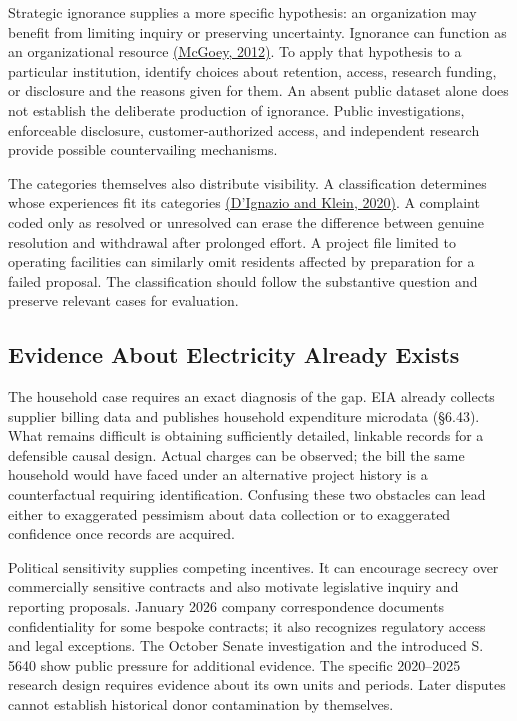 Strategic ignorance supplies a more specific hypothesis: an organization
may benefit from limiting inquiry or preserving uncertainty. Ignorance
can function as an organizational resource
\href{https://repository.essex.ac.uk/5131/}{(McGoey, 2012)}. To apply
that hypothesis to a particular institution, identify choices about
retention, access, research funding, or disclosure and the reasons given
for them. An absent public dataset alone does not establish the
deliberate production of ignorance. Public investigations, enforceable
disclosure, customer-authorized access, and independent research provide
possible countervailing mechanisms.

The categories themselves also distribute visibility. A classification
determines whose experiences fit its categories
\href{https://data-feminism.mitpress.mit.edu/pub/h1w0nbqp/release/3}{(D'Ignazio
and Klein, 2020)}. A complaint coded only as resolved or unresolved can
erase the difference between genuine resolution and withdrawal after
prolonged effort. A project file limited to operating facilities can
similarly omit residents affected by preparation for a failed proposal.
The classification should follow the substantive question and preserve
relevant cases for evaluation.

\hypertarget{M09-evidence-about-electricity-already-exists}{%
\subsection{Evidence About Electricity Already
Exists}\label{M09-evidence-about-electricity-already-exists}}

\noindent \noindent The household case requires an exact diagnosis of the gap. EIA
already collects supplier billing data and publishes household
expenditure microdata (§6.43). What remains difficult is obtaining
sufficiently detailed, linkable records for a defensible causal design.
Actual charges can be observed; the bill the same household would have
faced under an alternative project history is a counterfactual requiring
identification. Confusing these two obstacles can lead either to
exaggerated pessimism about data collection or to exaggerated confidence
once records are acquired.

Political sensitivity supplies competing incentives. It can encourage
secrecy over commercially sensitive contracts and also motivate
legislative inquiry and reporting proposals. January 2026 company
correspondence documents confidentiality for some bespoke contracts; it
also recognizes regulatory access and legal exceptions. The October
Senate investigation and the introduced S. 5640 show public pressure for
additional evidence. The specific 2020--2025 research design requires
evidence about its own units and periods. Later disputes cannot
establish historical donor contamination by themselves.

